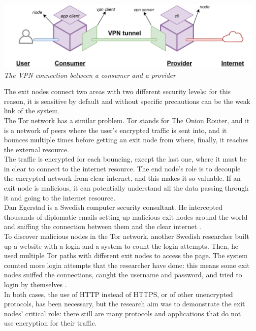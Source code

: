 \documentclass[12pt]{article}
\begin{document}
	\bigbreak
	\begin{center}
		\includegraphics[width=1\linewidth]{images/client_server_vpn_connection2.png}\\
		\small{\textit{The VPN connection between a consumer and a provider}}
	\end{center}
	\bigbreak

	The exit nodes connect two areas with two different security levels: for this reason, it is sensitive by default and without specific precautions can be the weak link of the system.\\
	The Tor network has a similar problem. Tor stands for The Onion Router, and it is a network of peers where the user's encrypted traffic is sent into, and it bounces multiple times before getting an exit node from where, finally, it reaches the external resource.\\
	The traffic is encrypted for each bouncing, except the last one, where it must be in clear to connect to the internet resource. The end node's role is to decouple the encrypted network from clear internet, and this makes it so valuable. If an exit node is malicious, it can potentially understand all the data passing through it and going to the internet resource.\\
	\bigbreak
	Dan Egerstad is a Swedish computer security consultant. He intercepted thousands of diplomatic emails setting up malicious exit nodes around the world and sniffing the connection between them and the clear internet \cite{exitnodeTOR}.\\
	To discover malicious nodes in the Tor network, another Swedish researcher built up a website with a login and a system to count the login attempts. Then, he used multiple Tor paths with different exit nodes to access the page. The system counted more login attempts that the researcher have done: this means some exit nodes sniffed the connections, caught the username and password, and tried to login by themselves \cite{exitnodeTOR2}.\\
	In both cases, the use of HTTP instead of HTTPS, or of other unencrypted protocols, has been necessary, but the research aim was to demonstrate the exit nodes' critical role: there still are many protocols and applications that do not use encryption for their traffic.\\
\end{document}
